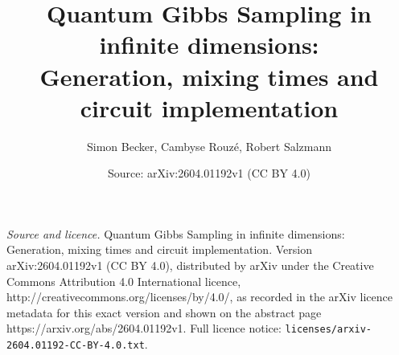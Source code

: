 \documentclass[10pt,a4paper]{amsart}
\title{Quantum Gibbs Sampling in infinite dimensions:\\ \tiny{Generation, mixing times and circuit implementation}}
\author{Simon Becker, Cambyse Rouz\'e, Robert Salzmann}
\date{Source: arXiv:2604.01192v1 (CC BY 4.0)}
\begin{document}
\maketitle

\noindent\emph{Source and licence.} Quantum Gibbs Sampling in infinite dimensions:\\ \tiny{Generation, mixing times and circuit implementation}. Version arXiv:2604.01192v1 (CC BY 4.0), distributed by arXiv under the Creative Commons Attribution 4.0 International licence, http://creativecommons.org/licenses/by/4.0/, as recorded in the arXiv licence metadata for this exact version and shown on the abstract page https://arxiv.org/abs/2604.01192v1. Full licence notice: \texttt{licenses/arxiv-2604.01192-CC-BY-4.0.txt}.\par\smallskip
\end{document}
